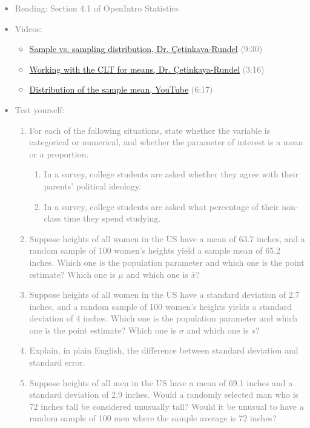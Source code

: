 \documentclass[11pt]{article}
\newcommand{\gray}[1]{\textcolor{gray}{#1}}
\begin{document}
\gray{
{\it
\vspace{-0.5cm}
\begin{itemize}
\renewcommand{\labelitemi}{{\textcolor{dark}{$\ast$}}}
\item Reading: Section 4.1 of OpenIntro Statistics
\item Videos: 
\begin{itemize}
\item \href{http://www.youtube.com/watch?v=dF18I7-Re4I}{Sample vs. sampling distribution, Dr. \c{C}etinkaya-Rundel} (9:30)
\item \href{http://www.youtube.com/watch?v=Cvc8sYAKmtI}{Working with the CLT for means, Dr. \c{C}etinkaya-Rundel} (3:16)
\item \href{http://www.youtube.com/watch?v=j4ZpJ0T6eFw&feature=autoplay&list=PL568547ACA9211CCA&playnext=1}{Distribution of the sample mean, YouTube} (6:17)
\end{itemize}
\item Test yourself: 
{\small
\begin{enumerate}
\item For each of the following situations, state whether the variable is categorical or numerical, and whether the parameter of interest is a mean or a proportion.
\begin{enumerate}
\item In a survey, college students are asked whether they agree with their parents' political ideology.  
\item In a survey, college students are asked what percentage of their non-class time they spend studying.
\end{enumerate}
\item Suppose heights of all women in the US have a mean of 63.7 inches, and a random sample of 100 women's heights yield a sample mean of 65.2 inches. Which one is the population parameter and which one is the point estimate? Which one is $\mu$ and which one is $\bar{x}$?
\item Suppose heights of all women in the US have a standard deviation of 2.7 inches, and a random sample of 100 women's heights yields a standard deviation of 4 inches. Which one is the population parameter and which one is the point estimate? Which one is $\sigma$ and which one is $s$?
\item Explain, in plain English, the difference between standard deviation and standard error.
\item Suppose heights of all men in the US have a mean of 69.1 inches and a standard deviation of 2.9 inches. Would a randomly selected man who is 72 inches tall be considered unusually tall? Would it be unusual to have a random sample of 100 men where the sample average is 72 inches?
\end{enumerate}
}
\end{itemize}
}}
\end{document}
